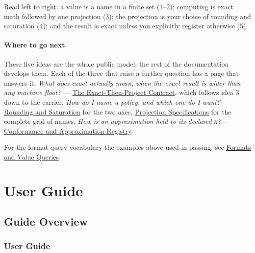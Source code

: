 Read left to right: a value is a name in a finite set (1–2); computing is exact math followed by one projection (3); the projection is your choice of rounding and saturation (4); and the result is exact unless you explicitly register otherwise (5).



\subsection{Where to go next}



\label{9854230807696872180}{}


These five ideas are the whole public model; the rest of the documentation develops them. Each of the three that raise a further question has a page that answers it. \emph{What does {\textquotedbl}exact{\textquotedbl} actually mean, when the exact result is wider than any machine float?} — \href{concept\_\allowbreak{}exact\_\allowbreak{}then\_\allowbreak{}project.md}{The Exact-Then-Project Contract}, which follows idea 3 down to the carrier. \emph{How do I name a policy, and which one do I want?} — \href{concept\_\allowbreak{}rounding\_\allowbreak{}saturation.md}{Rounding and Saturation} for the two axes, \href{reference\_\allowbreak{}projections.md}{Projection Specifications} for the complete grid of names. \emph{How is an approximation held to its declared κ?} — \href{reference\_\allowbreak{}conformance.md}{Conformance and Approximation Registry}.



For the format-query vocabulary the examples above used in passing, see \href{reference\_\allowbreak{}formats\_\allowbreak{}values.md}{Formats and Value Queries}.



\part{User Guide}


\chapter{Guide Overview}


\section{User Guide}



